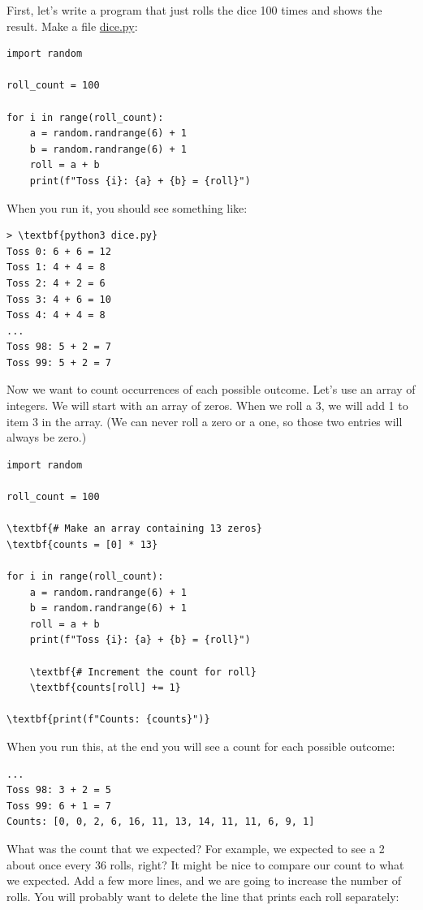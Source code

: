 First, let's write a program that just rolls the dice 100 times and shows the result. Make a file \url{dice.py}:
\begin{Verbatim}
import random

roll_count = 100

for i in range(roll_count):
    a = random.randrange(6) + 1
    b = random.randrange(6) + 1
    roll = a + b
    print(f"Toss {i}: {a} + {b} = {roll}")
\end{Verbatim}

When you run it, you should see something like:
\begin{Verbatim}[commandchars=\\\{\}]
> \textbf{python3 dice.py}
Toss 0: 6 + 6 = 12
Toss 1: 4 + 4 = 8
Toss 2: 4 + 2 = 6
Toss 3: 4 + 6 = 10
Toss 4: 4 + 4 = 8
...
Toss 98: 5 + 2 = 7
Toss 99: 5 + 2 = 7
\end{Verbatim}

Now we want to count occurrences of each possible outcome. Let's use an
array of integers. We will start with an array of zeros. When we roll a 3, we will add 1 to item 3 in the array. (We can
never roll a zero or a one, so those two entries will always be zero.)
\begin{Verbatim}[commandchars=\\\{\}]
import random

roll_count = 100

\textbf{# Make an array containing 13 zeros}
\textbf{counts = [0] * 13}

for i in range(roll_count):
    a = random.randrange(6) + 1
    b = random.randrange(6) + 1
    roll = a + b
    print(f"Toss {i}: {a} + {b} = {roll}")

    \textbf{# Increment the count for roll}
    \textbf{counts[roll] += 1}

\textbf{print(f"Counts: {counts}")}
\end{Verbatim}

When you run this, at the end you will see a count for each possible outcome:

\begin{Verbatim}
...
Toss 98: 3 + 2 = 5
Toss 99: 6 + 1 = 7
Counts: [0, 0, 2, 6, 16, 11, 13, 14, 11, 11, 6, 9, 1]
\end{Verbatim}

What was the count that we expected? For example, we expected to see a
2 about once every 36 rolls, right? It might be nice to compare our
count to what we expected. Add a few more lines, and we are going to
increase the number of rolls. You will probably want to delete the
line that prints each roll separately:

